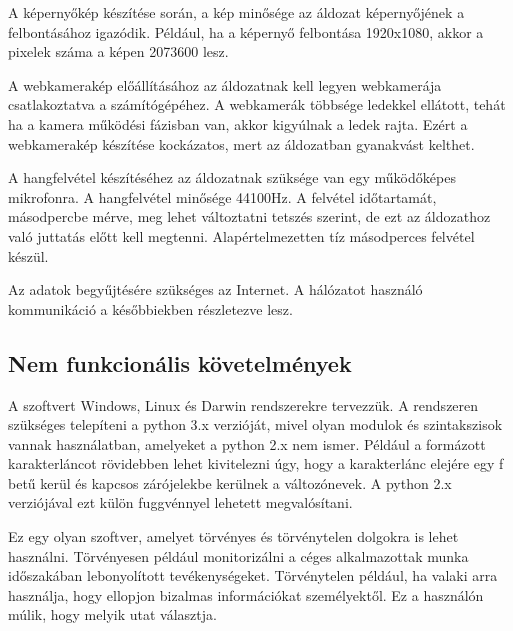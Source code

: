 \documentclass[12pt,a4paper,oneside]{report}
\begin{document}
A képernyőkép készítése során, a kép minősége az áldozat képernyőjének a felbontásához igazódik. Például, ha a képernyő felbontása 1920x1080, akkor a pixelek száma a képen 2073600 lesz.

A webkamerakép előállításához az áldozatnak kell legyen webkamerája csatlakoztatva a számítógépéhez. A webkamerák többsége ledekkel ellátott, tehát ha a kamera működési fázisban van, akkor kigyúlnak a ledek rajta. Ezért a webkamerakép készítése kockázatos, mert az áldozatban gyanakvást kelthet.

A hangfelvétel készítéséhez az áldozatnak szüksége van egy működőképes mikrofonra. A hangfelvétel minősége 44100Hz. A felvétel időtartamát, másodpercbe mérve, meg lehet változtatni tetszés szerint, de ezt az áldozathoz való juttatás előtt kell megtenni. Alapértelmezetten tíz másodperces felvétel készül.

Az adatok begyűjtésére szükséges az Internet. A hálózatot használó kommunikáció a későbbiekben részletezve lesz.

\subsection{Nem funkcionális követelmények}
A szoftvert Windows, Linux és Darwin rendszerekre tervezzük. A rendszeren szükséges telepíteni a python 3.x verzióját, mivel olyan modulok és szintakszisok vannak használatban, amelyeket a python 2.x nem ismer. Például a formázott karakterláncot rövidebben lehet kivitelezni úgy, hogy a karakterlánc elejére egy f betű kerül és kapcsos zárójelekbe kerülnek a változónevek. A python 2.x verziójával ezt külön fuggvénnyel lehetett megvalósítani.

Ez egy olyan szoftver, amelyet törvényes és törvénytelen dolgokra is lehet használni. Törvényesen például monitorizálni a céges alkalmazottak munka időszakában lebonyolított tevékenységeket. Törvénytelen például, ha valaki arra használja, hogy ellopjon bizalmas információkat személyektől. Ez a használón múlik, hogy melyik utat választja.
\end{document}
